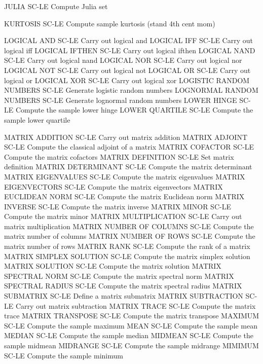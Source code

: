 JULIA                       SC-LE Compute Julia set

KURTOSIS                    SC-LE Compute sample kurtosis (stand 4th cent mom)

LOGICAL AND                 SC-LE Carry out logical and
LOGICAL IFF                 SC-LE Carry out logical iff
LOGICAL IFTHEN              SC-LE Carry out logical ifthen
LOGICAL NAND                SC-LE Carry out logical nand
LOGICAL NOR                 SC-LE Carry out logical nor
LOGICAL NOT                 SC-LE Carry out logical not
LOGICAL OR                  SC-LE Carry out logical or
LOGICAL XOR                 SC-LE Carry out logical xor
LOGISTIC RANDOM NUMBERS     SC-LE Generate logistic random numbers
LOGNORMAL RANDOM NUMBERS    SC-LE Generate lognormal random numbers
LOWER HINGE                 SC-LE Compute the sample lower hinge
LOWER QUARTILE              SC-LE Compute the sample lower quartile

MATRIX ADDITION             SC-LE Carry out matrix addition
MATRIX ADJOINT              SC-LE Compute the classical adjoint of a matrix
MATRIX COFACTOR             SC-LE Compute the matrix cofactors
MATRIX DEFINITION           SC-LE Set matrix definition
MATRIX DETERMINANT          SC-LE Compute the matrix determinant
MATRIX EIGENVALUES          SC-LE Compute the matrix eigenvalues
MATRIX EIGENVECTORS         SC-LE Compute the matrix eigenvectors
MATRIX EUCLIDEAN NORM       SC-LE Compute the matrix Euclidean norm
MATRIX INVERSE              SC-LE Compute the matrix inverse
MATRIX MINOR                SC-LE Compute the matrix minor
MATRIX MULTIPLICATION       SC-LE Carry out matrix multiplication
MATRIX NUMBER OF COLUMNS    SC-LE Compute the matrix number of columns
MATRIX NUMBER OF ROWS       SC-LE Compute the matrix number of rows
MATRIX RANK                 SC-LE Compute the rank of a matrix
MATRIX SIMPLEX SOLUTION     SC-LE Compute the matrix simplex solution
MATRIX SOLUTION             SC-LE Compute the matrix solution
MATRIX SPECTRAL NORM        SC-LE Compute the matrix spectral norm
MATRIX SPECTRAL RADIUS      SC-LE Compute the matrix spectral radius
MATRIX SUBMATRIX            SC-LE Define a matrix submatrix
MATRIX SUBTRACTION          SC-LE Carry out matrix subtraction
MATRIX TRACE                SC-LE Compute the matrix trace
MATRIX TRANSPOSE            SC-LE Compute the matrix transpose
MAXIMUM                     SC-LE Compute the sample maximum
MEAN                        SC-LE Compute the sample mean
MEDIAN                      SC-LE Compute the sample median
MIDMEAN                     SC-LE Compute the sample midmean
MIDRANGE                    SC-LE Compute the sample midrange
MIMIMUM                     SC-LE Compute the sample minimum

